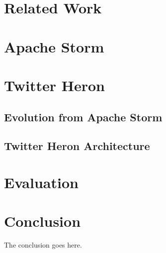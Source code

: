 \documentclass[conference]{IEEEtran}
\begin{document}
\section{Related Work}
\label{sec:RelatedWork}

\cite{InfoQGameChanger}

\section{Apache Storm}
\label{sec:ApacheStorm}

\cite{StormTwitter}

\section{Twitter Heron}
\label{sec:TwitterHeron}

\subsection{Evolution from Apache Storm}
\label{sec:EvolutionFromApacheStorm}

\subsection{Twitter Heron Architecture}
\label{sec:TwitterHeronArchitecture}



\section{Evaluation}
\label{sec:Evaluation}

\cite{TwitterHeronBlog}

\cite{TwitterHeron}


\section{Conclusion}
\label{sec:Conclusion}

The conclusion goes here.




\end{document}
